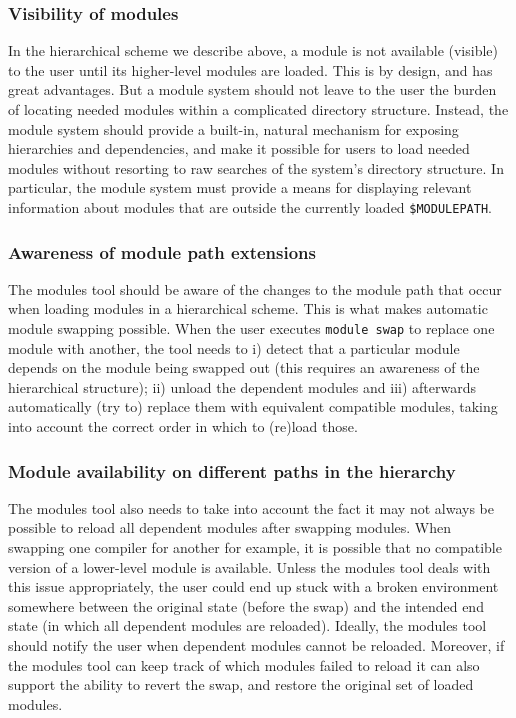 \subsubsection{Visibility of modules}
\label{sec:hierarchical_consequences_visibility}

In the hierarchical scheme we describe above, a module is not available (visible)
to the user until its higher-level  modules are loaded.  This
is by design, and has great advantages. But a module system should not leave to the
user the burden of locating needed modules within a complicated directory structure.  Instead, the module system should provide a built-in, natural mechanism for exposing hierarchies and
dependencies, and make it possible for users to load needed modules
without resorting to raw searches of the system's directory structure. In particular, the module system must provide a means for
displaying relevant information about modules that are outside the 
currently loaded \texttt{\small \$MODULEPATH}.

\subsubsection{Awareness of module path extensions}
\label{sec:hierarchical_consequences_extensions}

The modules tool should be aware of the changes  to the module path that
occur when loading modules in a hierarchical scheme. This is what makes
automatic module swapping possible. When the user executes \texttt{\small module swap} to replace one module with another, the tool needs to i) detect that a particular
module depends on the module being swapped out (this requires an awareness of
the hierarchical structure); ii) unload the dependent
modules and iii) afterwards
automatically (try to) replace them with equivalent compatible modules, taking into
account the correct order in which to (re)load those.

\subsubsection{Module availability on different paths in the hierarchy}
\label{sec:hierarchical_consequences_availability}

The modules tool also needs to take into account the fact it may not always be
possible to reload all dependent modules after swapping modules. When swapping
one compiler for another for example, it is possible that no compatible version of a
lower-level  module is available. Unless the modules tool deals with this issue
appropriately, the user could end up stuck with a broken environment somewhere between
the original state (before the swap) and the intended end state (in which all
dependent modules are reloaded). Ideally, the modules tool should notify the user
when dependent modules cannot be reloaded. Moreover, if the modules tool can keep
track of which modules failed to reload it can also support the ability to revert
the swap, and restore the original set of loaded modules.

